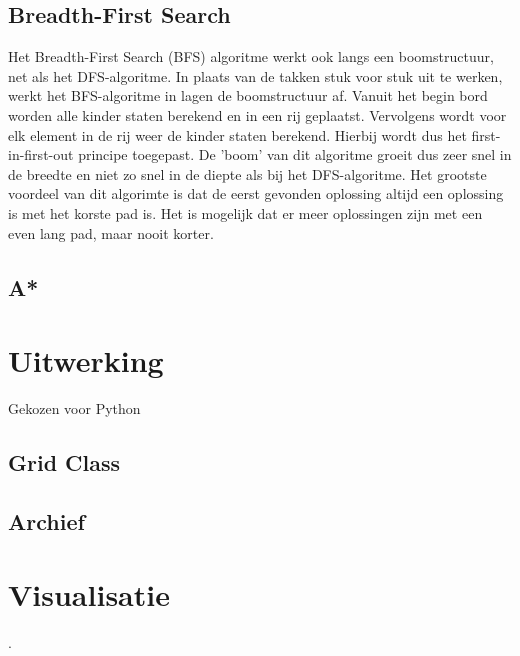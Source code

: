 \documentclass[a4paper]{article}
\begin{document}
\subsection{Breadth-First Search}
Het Breadth-First Search (BFS) algoritme werkt ook langs een boomstructuur, net als het DFS-algoritme. In plaats van de takken stuk voor stuk uit te werken, werkt het BFS-algoritme in lagen de boomstructuur af. Vanuit het begin bord worden alle kinder staten berekend en in een rij geplaatst. Vervolgens wordt voor elk element in de rij weer de kinder staten berekend. Hierbij wordt dus het first-in-first-out principe toegepast. De 'boom' van dit algoritme groeit dus zeer snel in de breedte en niet zo snel in de diepte als bij het DFS-algoritme. 
	Het grootste voordeel van dit algorimte is dat de eerst gevonden oplossing altijd een oplossing is met het korste pad is. Het is mogelijk dat er meer oplossingen zijn met een even lang pad, maar nooit korter. 

\subsection{A*}

\section{Uitwerking}
Gekozen voor Python

\subsection{Grid Class}

\subsection{Archief}


\section{Visualisatie}


 \cite{greenwade93}. 



\end{document}
